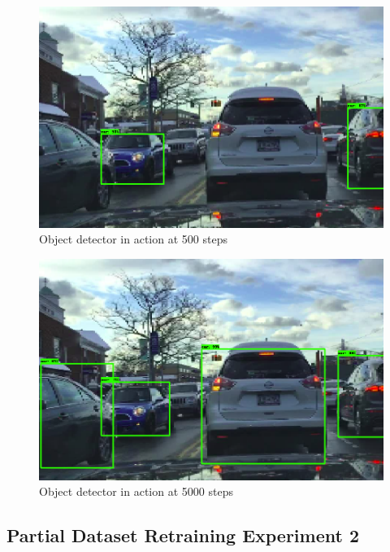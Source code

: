 \documentclass[12pt]{report}
\begin{document}
\vspace{0.5cm}
\begin{figure}[ht!]
	\centering
	\includegraphics[width=15cm]{class-smalldata-500}
	\caption{Object detector in action at 500 steps}
	\label{fig:class-smalldata-500}
\end{figure}

\newpage
\vspace{0.5cm}
\begin{figure}[ht!]
	\centering
	\includegraphics[width=15cm]{classes-smalldata-5k}
	\caption{Object detector in action at 5000 steps}
	\label{fig:class-smalldata-5k}
\end{figure}

\newpage
\subsection{Partial Dataset Retraining Experiment 2}
\end{document}
